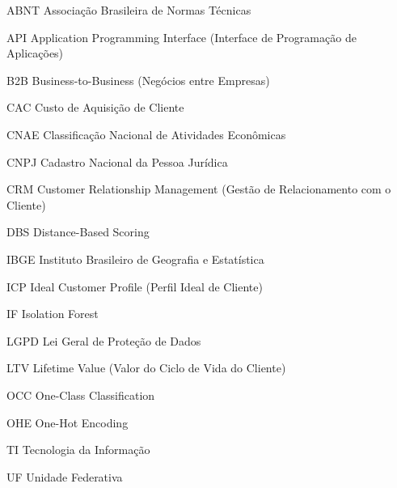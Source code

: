 \documentclass[
        oneside,      %
        english,			
        brazil			 
        ]{abntbibufjf}
\begin{document}
\cleardoublepage
{}



\listoftables*    %

\cleardoublepage


\begin{siglas}

  \item[ABNT] Associa\c{c}\~ao Brasileira de Normas T\'ecnicas
  \item[API] Application Programming Interface (Interface de Programa\c{c}\~ao de Aplica\c{c}\~oes)
  \item[B2B] Business-to-Business (Neg\'ocios entre Empresas)
  \item[CAC] Custo de Aquisi\c{c}\~ao de Cliente
  \item[CNAE] Classifica\c{c}\~ao Nacional de Atividades Econ\^omicas
  \item[CNPJ] Cadastro Nacional da Pessoa Jur\'idica
  \item[CRM] Customer Relationship Management (Gest\~ao de Relacionamento com o Cliente)
  \item[DBS] Distance-Based Scoring
  \item[IBGE] Instituto Brasileiro de Geografia e Estat\'istica
  \item[ICP] Ideal Customer Profile (Perfil Ideal de Cliente)
  \item[IF] Isolation Forest
  \item[LGPD] Lei Geral de Prote\c{c}\~ao de Dados
  \item[LTV] Lifetime Value (Valor do Ciclo de Vida do Cliente)
  \item[OCC] One-Class Classification
  \item[OHE] One-Hot Encoding
  \item[TI] Tecnologia da Informa\c{c}\~ao
  \item[UF] Unidade Federativa

\end{siglas}
 

\tableofcontents*
\cleardoublepage
\end{document}
